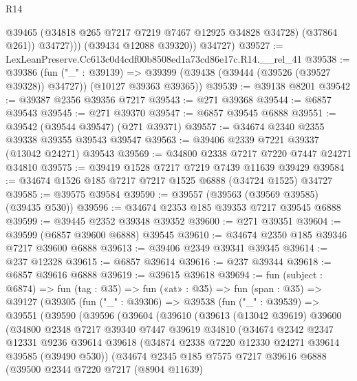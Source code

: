 \begin{lexlean}{R14}
\begin{coremodule}
                @39465
                (@34818 @265 @7217 @7219 @7467 @12925 @34828 @34728)
                (@37864 @261))
              @34727)))
        (@39434 @12088 @39320))
      @34727)
@39527 := LexLeanPreserve.Cc613c0d4cdf00b8508ed1a73cd86e17c.R14.__rel_41
@39538 := @39386
    (fun ("_" : @39139) =>
    @39399 (@39438 (@39444 (@39526 (@39527 @39328)) @34727)) (@10127 @39363 @39365))
@39539 := @39138 @8201
@39542 := @39387 @2356 @39356 @7217
@39543 := @271 @39368
@39544 := @6857 @39543
@39545 := @271 @39370
@39547 := @6857 @39545 @6888
@39551 := @39542 (@39544 @39547) (@271 @39371)
@39557 := @34674 @2340 @2355 @39338 @39355 @39543 @39547
@39563 := @39406 @2339 @7221 @39337 (@13042 @24271) @39543
@39569 := @34800 @2338 @7217 @7220 @7447 @24271 @34810
@39575 := @39419 @1528 @7217 @7219 @7439 @11639 @39429
@39584 := @34674 @1526 @185 @7217 @7217 @1525 @6888 (@34724 @1525) @34727
@39585 := @39575 @39584
@39590 := @39557 (@39563 (@39569 @39585) (@39435 @530))
@39596 := @34674 @2353 @185 @39353 @7217 @39545 @6888
@39599 := @39445 @2352 @39348 @39352
@39600 := @271 @39351
@39604 := @39599 (@6857 @39600 @6888) @39545
@39610 := @34674 @2350 @185 @39346 @7217 @39600 @6888
@39613 := @39406 @2349 @39341 @39345
@39614 := @237 @12328
@39615 := @6857 @39614
@39616 := @237 @39344
@39618 := @6857 @39616 @6888
@39619 := @39615 @39618
@39694 := fun (subject : @6874) =>
  fun (tag : @35) =>
  fun («at» : @35) =>
  fun (span : @35) =>
  @39127
    (@39305
      (fun ("_" : @39306) =>
      @39538
        (fun ("_" : @39539) =>
        @39551
          (@39590
            (@39596
              (@39604
                (@39610
                  (@39613
                    (@13042 @39619)
                    @39600
                    (@34800
                      @2348
                      @7217
                      @39340
                      @7447
                      @39619
                      @34810
                      (@34674
                        @2342
                        @2347
                        @12331
                        @9236
                        @39614
                        @39618
                        (@34874 @2338 @7220 @12330 @24271 @39614 @39585 (@39490 @530))
                        (@34674
                          @2345
                          @185
                          @7575
                          @7217
                          @39616
                          @6888
                          (@39500
                            @2344
                            @7220
                            @7217
                            (@8904 @11639)

\end{coremodule}
\end{lexlean}
